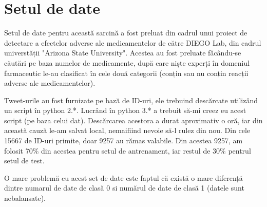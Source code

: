\chapter{Setul de date}

Setul de date pentru această sarcină a fost preluat din cadrul unui
proiect de detectare a efectelor adverse ale medicamentelor de către
DIEGO Lab, din cadrul universtății "Arizona State University". Acestea
au fost preluate făcându-se căutări pe baza numelor de medicamente, după 
care niște experți în domeniul farmaceutic le-au clasificat în cele două
categorii (conțin sau nu conțin reacții adverse ale medicamentelor).

Tweet-urile au fost furnizate pe bază de ID-uri, ele trebuind descărcate
utilizând un script în python 2.*. Lucrând în python 3.* a trebuit să-mi
creez eu acest script (pe baza celui dat). Descărcarea acestora a durat
aproximativ o oră, iar din această cauză le-am salvat local, nemaifiind
nevoie să-l rulez din nou. Din cele 15667 de ID-uri primite, doar 9257 au rămas valabile.
Din acestea 9257, am folosit 70\% din acestea pentru setul de antrenament, iar restul
de 30\% pentrul setul de test.

O mare problemă cu acest set de date este faptul că există o mare diferență dintre
numarul de date de clasă 0 si numărul de date de clasă 1 (datele sunt nebalansate).
